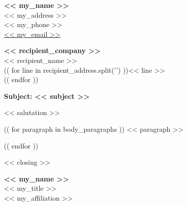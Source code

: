 \documentclass[11pt,a4paper]{article}
\begin{document}
\textbf{\large << my_name >>} \\
<< my_address >> \\
<< my_phone >> \\
\href{mailto:<< my_email >>}{<< my_email >>}

\vspace{12pt}

\textbf{<< recipient_company >>} \\
<< recipient_name >> \\
(( for line in recipient_address.split('\n') ))<< line >> \\
(( endfor ))

\vspace{12pt}

\textbf{Subject: << subject >>}

\vspace{6pt}

<< salutation >>

(( for paragraph in body_paragraphs ))
<< paragraph >>

(( endfor ))

\vspace{18pt}

<< closing >>

\vspace{12pt}

\textbf{<< my_name >>} \\
<< my_title >> \\
<< my_affiliation >>
\end{document}
